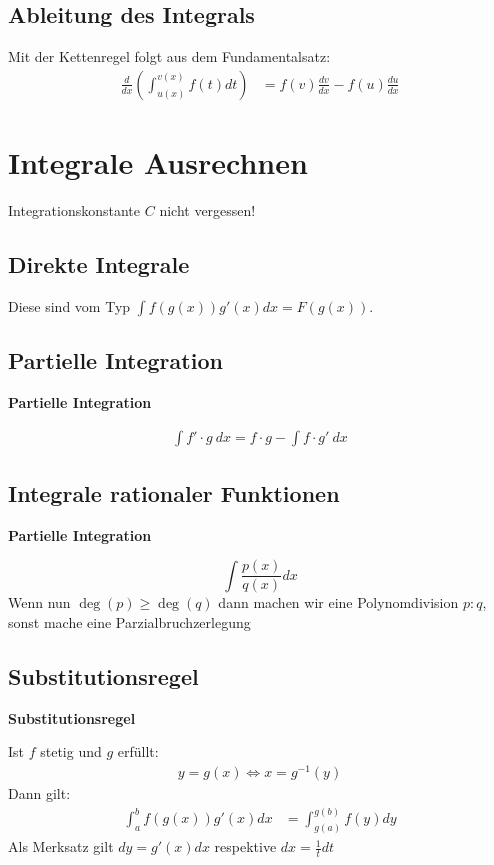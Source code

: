 \documentclass[25pt]{sciposter}
\newenvironment{method}[1]{\begin{mdframed}[backgroundcolor=blue!10,innertopmargin=15pt, innerbottommargin=15pt,nobreak=true]
		\textbf{#1 }
	}
	{ 
	\end{mdframed}
}
\newenvironment{important}{\begin{mdframed}[backgroundcolor=red!50,innertopmargin=15pt, innerbottommargin=15pt, nobreak=true]
		\Large
	}
	{ 
	\end{mdframed}
}
\begin{document}
\begin{multicols}{3}
\subsection*{Ableitung des Integrals}
Mit der Kettenregel folgt aus dem Fundamentalsatz:
\begin{align*}
\frac{d}{dx} \left( \int_{u(x)}^{v(x)} f(t)  dt \right) &= f(v)\frac{dv}{dx} - f(u)\frac{du}{dx}
\end{align*}

\section*{Integrale Ausrechnen}

\begin{important}
Integrationskonstante $C$ nicht vergessen!
\end{important}

\subsection*{Direkte Integrale}
Diese sind vom Typ $\int f(g(x)) g'(x) dx = F(g(x))$.

\subsection*{Partielle Integration}
\begin{method}{Partielle Integration}
\begin{align*}
	\int f' \cdot g \ dx = f \cdot g - \int f \cdot g' \  dx
\end{align*}
\end{method}



\subsection*{Integrale rationaler Funktionen}
\begin{method}{Partielle Integration}
	$$\int \frac{p(x)}{q(x)} dx$$
	Wenn nun $\deg(p) \geq \deg(q)$ dann machen wir eine Polynomdivision $p:q$, sonst mache eine Parzialbruchzerlegung
\end{method}

\subsection*{Substitutionsregel}
\begin{method}{Substitutionsregel}
Ist $f$ stetig und $g$ erfüllt:
\begin{align*}
	y = g(x) \iff x = g^{-1}(y)
\end{align*}
Dann gilt:
\begin{align*}
\int_a ^b f(g(x))g'(x) dx &= \int_{g(a)}^{g(b)} f(y) dy
\end{align*}
Als Merksatz gilt $dy = g'(x) dx$ respektive $dx = \frac{1}{t} dt$
\end{method}


\end{multicols}
\end{document}
